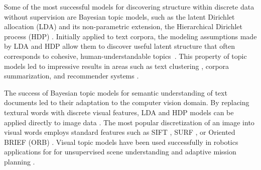 \documentclass[letterpaper, 10 pt, conference]{ieeeconf}
\begin{document}

Some of the most successful models for discovering structure within discrete data without supervision are Bayesian topic models, such as the latent Dirichlet allocation (LDA) \cite{Blei2003} and its non-parametric extension, the Hierarchical Dirichlet process (HDP) \cite{Teh2010}. Initially applied to text corpora, the modeling assumptions made by LDA and HDP allow them to discover useful latent structure that often corresponds to cohesive, human-understandable topics~\cite{Chang2009}. This property of topic models led to impressive results in areas such as text clustering \cite{Blei2003}, corpora summarization, and recommender systems \cite{Krestel}.  

The success of Bayesian topic models for semantic understanding of text documents led to their adaptation to the computer vision domain. By replacing textural words with discrete visual features, LDA and HDP models can be applied directly to image data \cite{Bosch:2006, FeiFei:2005:CVPR, Wang2007}. The most popular discretization of an image into visual words employs standard features such as SIFT \cite{Lowe:IJCV:2004}, SURF \cite{Bay:ECCV:2006}, or Oriented BRIEF (ORB) \cite{RubleeE2011}. Visual topic models have been used successfully in robotics applications for for unsupervised scene understanding \cite{Steinbergb} and adaptive mission planning \cite{Girdhar2015}. 

\end{document}
